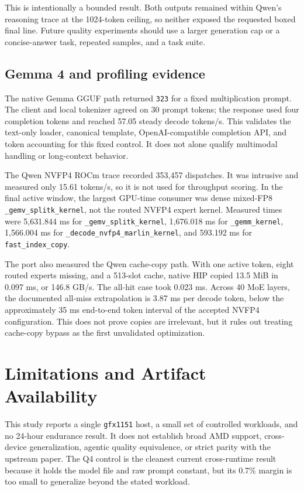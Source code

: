 \documentclass[10pt,letterpaper,twocolumn]{article}
\begin{document}
This is intentionally a bounded result. Both outputs remained within Qwen's reasoning trace at the 1024-token ceiling, so neither exposed the requested boxed final line. Future quality experiments should use a larger generation cap or a concise-answer task, repeated samples, and a task suite.

\subsection{Gemma 4 and profiling evidence}

The native Gemma GGUF path returned \texttt{323} for a fixed multiplication prompt. The client and local tokenizer agreed on 30 prompt tokens; the response used four completion tokens and reached 57.05 steady decode tokens/s. This validates the text-only loader, canonical template, OpenAI-compatible completion API, and token accounting for this fixed control. It does not alone qualify multimodal handling or long-context behavior.

The Qwen NVFP4 ROCm trace recorded 353,457 dispatches. It was intrusive and measured only 15.61 tokens/s, so it is not used for throughput scoring. In the final active window, the largest GPU-time consumer was dense mixed-FP8 \texttt{\_gemv\_splitk\_kernel}, not the routed NVFP4 expert kernel. Measured times were 5,631.844 ms for \texttt{\_gemv\_splitk\_kernel}, 1,676.018 ms for \texttt{\_gemm\_kernel}, 1,566.004 ms for \texttt{\_decode\_nvfp4\_marlin\_kernel}, and 593.192 ms for \texttt{fast\_index\_copy}.

The port also measured the Qwen cache-copy path. With one active token, eight routed experts missing, and a 513-slot cache, native HIP copied 13.5 MiB in 0.097 ms, or 146.8 GB/s. The all-hit case took 0.023 ms. Across 40 MoE layers, the documented all-miss extrapolation is 3.87 ms per decode token, below the approximately 35 ms end-to-end token interval of the accepted NVFP4 configuration. This does not prove copies are irrelevant, but it rules out treating cache-copy bypass as the first unvalidated optimization.

\section{Limitations and Artifact Availability}

This study reports a single \texttt{gfx1151} host, a small set of controlled workloads, and no 24-hour endurance result. It does not establish broad AMD support, cross-device generalization, agentic quality equivalence, or strict parity with the upstream paper. The Q4 control is the cleanest current cross-runtime result because it holds the model file and raw prompt constant, but its 0.7\% margin is too small to generalize beyond the stated workload.
\end{document}
